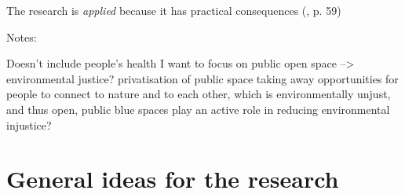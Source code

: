 \documentclass{article}
\begin{document}
The research is \textit{applied} because it has practical consequences (\cite{booth2003craft}, p. 59)

Notes:

\begin{outline}
	\1 Doesn't include people's health
	\1 I want to focus on public open space --> environmental justice? privatisation of public space taking away opportunities for people to connect to nature and to each other, which is environmentally unjust, and thus open, public blue spaces play an active role in reducing environmental injustice? 
\end{outline}

\section{General ideas for the research}
\end{document}
